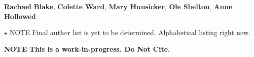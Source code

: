 \textbf{Rachael Blake}, 
\textbf{Colette Ward},
\textbf{Mary Hunsicker},
\textbf{Ole Shelton},
\textbf{Anne Hollowed}

$\star$ NOTE Final author list is yet to be determined. Alphabetical listing right now. 

\textbf {NOTE This is a work-in-progress.  Do Not Cite.}  

